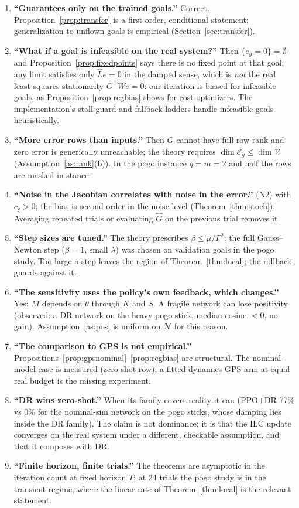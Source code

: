 \documentclass[11pt]{article}
\theoremstyle{definition}
\theoremstyle{remark}
\newcommand{\cV}{\mathcal{V}}
\newcommand{\cE}{\mathcal{E}}
\newcommand{\cN}{\mathcal{N}}
\newcommand{\Ghat}{\widehat G}
\newcommand{\Lhat}{\widehat L}
\begin{document}
\begin{enumerate}[leftmargin=1.5em]
\item \textbf{``Guarantees only on the trained goals.''} Correct. Proposition~\ref{prop:transfer} is a first-order,
  conditional statement; generalization to unflown goals is empirical (Section~\ref{sec:transfer}).
\item \textbf{``What if a goal is infeasible on the real system?''} Then $\{e_g=0\}=\emptyset$ and
  Proposition~\ref{prop:fixedpoints} says there is no fixed point at that goal; any limit satisfies only
  $\Lhat e=0$ in the damped sense, which is \emph{not} the real least-squares stationarity $G^\top We=0$: our iteration
  is biased for infeasible goals, as Proposition~\ref{prop:regbias} shows for cost-optimizers. The implementation's stall
  guard and fallback ladders handle infeasible goals heuristically.
\item \textbf{``More error rows than inputs.''} Then $\Ghat$ cannot have full row rank and zero error is generically
  unreachable; the theory requires $\dim\cE_g\le\dim\cV$ (Assumption~\ref{as:rank}(b)). In the pogo instance $q=m=2$ and
  half the rows are masked in stance.
\item \textbf{``Noise in the Jacobian correlates with noise in the error.''} (N2) with $c_\xi>0$; the bias is second
  order in the noise level (Theorem~\ref{thm:stoch}). Averaging repeated trials or evaluating $\Ghat$ on the previous
  trial removes it.
\item \textbf{``Step sizes are tuned.''} The theory prescribes $\beta\le\mu/\Gamma^2$; the full Gauss--Newton step
  ($\beta=1$, small $\lambda$) was chosen on validation goals in the pogo study. Too large a step leaves the region of
  Theorem~\ref{thm:local}; the rollback guards against it.
\item \textbf{``The sensitivity uses the policy's own feedback, which changes.''} Yes: $M$ depends on $\theta$ through
  $K$ and $S$. A fragile network can lose positivity (observed: a DR network on the heavy pogo stick, median cosine
  $<0$, no gain). Assumption~\ref{as:pos} is uniform on $\cN$ for this reason.
\item \textbf{``The comparison to GPS is not empirical.''} Propositions~\ref{prop:gpsnominal}--\ref{prop:regbias} are
  structural. The nominal-model case is measured (zero-shot row); a fitted-dynamics GPS arm at equal real budget is the
  missing experiment.
\item \textbf{``DR wins zero-shot.''} When its family covers reality it can (PPO+DR 77\% vs 0\% for the nominal-sim
  network on the pogo sticks, whose damping lies inside the DR family). The claim is not dominance; it is that the ILC
  update converges on the real system under a different, checkable assumption, and that it composes with DR.
\item \textbf{``Finite horizon, finite trials.''} The theorems are asymptotic in the iteration count at fixed horizon $T$;
  at 24 trials the pogo study is in the transient regime, where the linear rate of Theorem~\ref{thm:local} is the
  relevant statement.
\end{enumerate}
\end{document}
